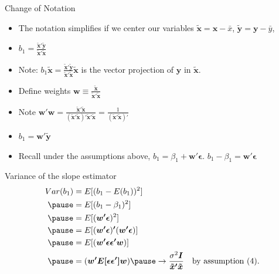 \documentclass[aspectratio=169, handout]{beamer}
\numberwithin{equation}{section}
\begin{document}
\begin{frame}{Change of Notation}
\begin{itemize}
\item The notation simplifies if we center our variables $\bm{\tilde{x}}=\bm{x}-\bar{x}$, $\bm{\tilde{y}}=\bm{y}-\bar{y}$, \pause
\item $b_1= \frac{\bm{\tilde{x}'\tilde{y}}}{\bm{\tilde{x}'\tilde{x}}}$\pause
\item Note: $b_1\bm{\tilde{x}}=\frac{\bm{\tilde{x}'\tilde{y}}}{\bm{\tilde{x}'\tilde{x}}}\bm{\tilde{x}}$ is the vector projection of $\bm{y}$ in $\bm{\tilde{x}}$.
\item Define weights $\bm{w}\equiv \frac{\bm{\tilde{x}}}{\bm{\tilde{x}'\tilde{x}}}$\pause
\item Note $\bm{w'}\bm{w}= \frac{\bm{\tilde{x}'\tilde{x}}}{\bm{(\tilde{x}'\tilde{x})'\tilde{x}'\tilde{x}}}=\frac{1}{\bm{(\tilde{x}'\tilde{x})'}}$\pause
\item $b_1=\bm{w'}\bm{\tilde{y}}$\pause
\item Recall under the assumptions above, $b_1=\beta_1+\bm{w'}\bm{\epsilon}$.  $b_1-\beta_1=\bm{w'}\bm{\epsilon}$
\end{itemize}
\end{frame}

\begin{frame}{Variance of the slope estimator}
\begin{align*}
Var(b_1)&=E[(b_1-E(b_1))^2]\\\pause
&=E[(b_1-\beta_1)^2]\\\pause
&=E[(\bm{w' \epsilon})^2]\\\pause
&=E[(\bm{w' \epsilon})\bm{'}(\bm{w' \epsilon})]\\\pause
&=E[(\bm{w' \epsilon  \epsilon' w})]\\\pause
&=(\bm{w' E[\epsilon \epsilon'] w}) \pause\rightarrow \frac{\sigma^2\bm{I}}{\bm{\tilde{x}'\tilde{x} } }\quad \text{by assumption (4).}
\end{align*}
\end{frame}
\end{document}
